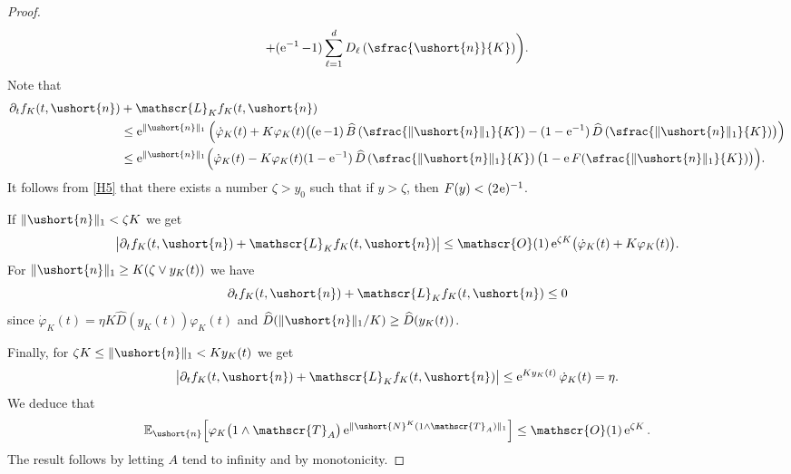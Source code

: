 \documentclass[JEP,XML,SOM,Unicode]{cedram}
\newcommand{\scaleto}[2]{#1}
\let\mathcal\mathscr
\numberwithin{equation}{section}
\theoremstyle{plain}
\theoremstyle{definition}
\newcommand{\E}{{\mathbb{E}}}
\newcommand{\Oun}{\mathcal{O}(1)}
\newcommand{\sK}{K}
\newcommand{\gen}{\mathscr{L}_{\sK}}
\newcommand{\vecn}{\ushort{n}}
\newcommand{\sleproc}{\ushort{N}^{K}}
\newcommand{\e}{\operatorname{e}}
\newcommand{\norm}[1]{\|#1\|_{1}}\let\snorm\norm
\begin{document}
\begin{proof}
\begin{multline*}
+(\e^{-1}-1)\sum_{\ell=1}^{d}D_{\ell}\left(\sfrac{\vecn}{K}\right)\biggr).
\end{multline*}
Note that
\begin{align*}
\partial_{t}f_{\sK}(t,\vecn)&+\gen f_{\sK}(t,\vecn)\\
& \leq \e^{\|\vecn\|_{1}}\left(\dot\varphi_{\sK}(t)
+ K\varphi_{\sK}(t) \bigl((\e-1)\,\widehat{B}\left(\sfrac{\norm{\vecn}}{K}\right)-(1-\e^{-1})\,\widehat{D}\left(\sfrac{\norm{\vecn}}{K}\right)\bigr)\right)
\\
&\leq
\e^{\|\vecn\|_{1}}\Bigl(\dot\varphi_{\sK}(t)- K\varphi_{\sK}(t)(1-\e^{-1})\,\widehat{D}\left(\sfrac{\norm{\vecn}}{K}\right)
\bigl(1 - \e F(\sfrac{\norm{\vecn}}{K})\bigr)\Bigr).
\end{align*}
It follows from \eqref{H5} that there exists a number $\zeta>y_{0}$ such that if $y>\zeta$, then $F(y)<(2 \hspace{-1pt}\e)^{-1}$.

If $\norm{\vecn}<\zeta K$ we get
\[
\big|\partial_{t}f_{\sK}(t,\vecn)+\gen f_{\sK}(t,\vecn)\big|\le
\Oun \e^{\zeta K}\bigl(\dot\varphi_{\sK}(t)+K\varphi_{\sK}(t)\bigr).
\]
For $\norm{\vecn}\ge K(\zeta\vee y_{\sK}(t))$ we have
\[
\partial_{t}f_{\sK}(t,\vecn)+\gen f_{\sK}(t,\vecn)\le 0
\]
since $\dot\varphi_{\sK}(t) = \eta K \widehat{D}(y_{\sK}(t))\varphi_{\sK}(t)$ and $\widehat{D}(\norm{\vecn}/K)\geq \widehat{D}(y_{\sK}(t))$.

Finally, for $\zeta K\le \norm{\vecn}<K y_{\sK}(t)$ we get
\[
\big|\partial_{t}f_{\sK}(t,\vecn)+\gen f_{\sK}(t,\vecn)\big|\le \e^{K y_{\sK}(t)}\dot\varphi_{\sK}(t) = \eta.
\]
We deduce that
\[
\E_{\vecn}\Bigl[\varphi_{\sK}\bigl(1\wedge \mathcal{T}_A\bigr)\e^{\|\sleproc(1\wedge \mathcal{T}_A)\|_{\scaleto{1}
{3.5pt}}}\Bigr]
\le \Oun \e^{\zeta K}.
\]
The result follows by letting $A$ tend to infinity and by monotonicity.
\end{proof}
\end{document}
